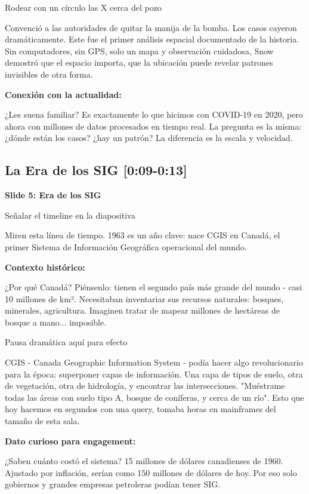 \documentclass[11pt,a4paper]{article}
\newcommand{\tiempo}[1]{\textcolor{timecolor}{\faIcon{clock} \textbf{[#1]}}}
\newcommand{\decir}[1]{\begin{tcolorbox}[colback=blue!5,colframe=usachblue,title={\faIcon{microphone} DECIR}]#1\end{tcolorbox}}
\newcommand{\hacer}[1]{\begin{tcolorbox}[colback=green!5,colframe=green!50!black,title={\faIcon{hand-point-right} HACER}]#1\end{tcolorbox}}
\newcommand{\nota}[1]{\begin{tcolorbox}[colback=yellow!10,colframe=orange,title={\faIcon{sticky-note} NOTA}]#1\end{tcolorbox}}
\begin{document}
\hacer{Rodear con un círculo las X cerca del pozo}

\decir{Convenció a las autoridades de quitar la manija de la bomba. Los casos cayeron dramáticamente. Este fue el primer análisis espacial documentado de la historia. Sin computadores, sin GPS, solo un mapa y observación cuidadosa, Snow demostró que el espacio importa, que la ubicación puede revelar patrones invisibles de otra forma.}

\textbf{Conexión con la actualidad:}

\decir{¿Les suena familiar? Es exactamente lo que hicimos con COVID-19 en 2020, pero ahora con millones de datos procesados en tiempo real. La pregunta es la misma: ¿dónde están los casos? ¿hay un patrón? La diferencia es la escala y velocidad.}

\subsection{La Era de los SIG \tiempo{0:09-0:13}}

\textbf{Slide 5: Era de los SIG}

\hacer{Señalar el timeline en la diapositiva}

\decir{Miren esta línea de tiempo. 1963 es un año clave: nace CGIS en Canadá, el primer Sistema de Información Geográfica operacional del mundo.}

\textbf{Contexto histórico:}

\decir{¿Por qué Canadá? Piénsenlo: tienen el segundo país más grande del mundo - casi 10 millones de km². Necesitaban inventariar sus recursos naturales: bosques, minerales, agricultura. Imaginen tratar de mapear millones de hectáreas de bosque a mano... imposible.}

\nota{Pausa dramática aquí para efecto}

\decir{CGIS - Canada Geographic Information System - podía hacer algo revolucionario para la época: superponer capas de información. Una capa de tipos de suelo, otra de vegetación, otra de hidrología, y encontrar las intersecciones. "Muéstrame todas las áreas con suelo tipo A, bosque de coníferas, y cerca de un río". Esto que hoy hacemos en segundos con una query, tomaba horas en mainframes del tamaño de esta sala.}

\textbf{Dato curioso para engagement:}

\decir{¿Saben cuánto costó el sistema? 15 millones de dólares canadienses de 1960. Ajustado por inflación, serían como 150 millones de dólares de hoy. Por eso solo gobiernos y grandes empresas petroleras podían tener SIG.}
\end{document}
